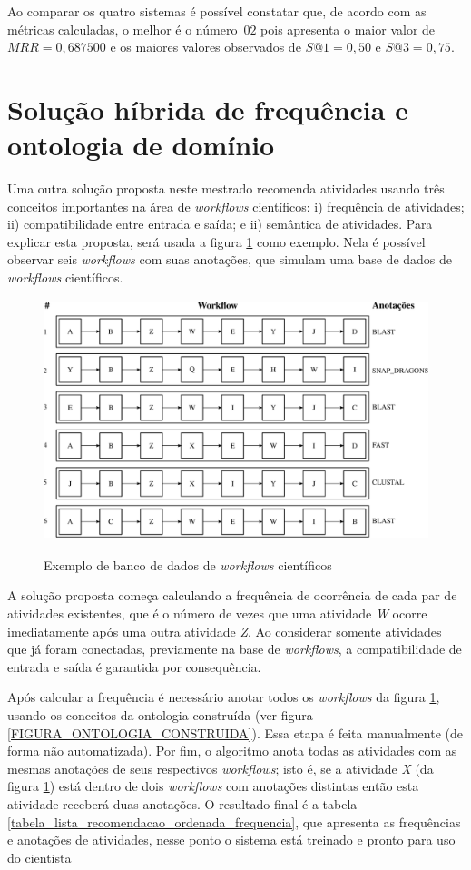Ao comparar os quatro sistemas é possível constatar que, de acordo com as métricas calculadas, o melhor é o número~\(02\) pois apresenta o maior valor de \(MRR = 0,687500\) e os maiores valores observados de \(S@1 = 0,50\) e \(S@3 = 0,75\).


\section{Solução híbrida de frequência e ontologia de domínio}\label{SEC_HIBRIDA_PROPOSTA} 
Uma outra solução proposta neste mestrado recomenda atividades usando três conceitos importantes na área de \emph{workflows} científicos: i) frequência de atividades; ii) compatibilidade entre entrada e saída; e ii) semântica de atividades. Para explicar esta proposta, será usada a figura \ref{FIGURA_ONTOLOGIA_CONSTRUIDA2} como exemplo. Nela é possível observar seis \emph{workflows} com suas anotações, que simulam uma base de dados de \emph{workflows} científicos.
\begin{figure}[!hbt]
	\centering
 	\caption{Exemplo de banco de dados de \emph{workflows} científicos}
		\includegraphics[width=12cm, height=7cm]{./secoes/solucaoProposta/pics/img/recomendacaofreqontologia.eps}
	\label{FIGURA_ONTOLOGIA_CONSTRUIDA2}
	\source{\varAutorData}
\end{figure}

A solução proposta começa calculando a frequência de ocorrência de cada par de atividades existentes, que é o número de vezes que uma atividade \emph{W} ocorre imediatamente após uma outra atividade \emph{Z}. Ao considerar somente atividades que já foram conectadas, previamente na base de \emph{workflows}, a compatibilidade de entrada e saída é garantida por consequência.

Após calcular a frequência é necessário anotar todos os \emph{workflows} da figura \ref{FIGURA_ONTOLOGIA_CONSTRUIDA2}, usando os conceitos da ontologia construída (ver figura \ref{FIGURA_ONTOLOGIA_CONSTRUIDA}). Essa etapa é feita manualmente (de forma não automatizada). Por fim, o algoritmo anota todas as atividades com as mesmas anotações de seus respectivos \emph{workflows}; isto é, se a atividade \emph{X} (da figura \ref{FIGURA_ONTOLOGIA_CONSTRUIDA2}) está dentro de dois \emph{workflows} com anotações distintas então esta atividade receberá duas anotações. O resultado final é a tabela \ref{tabela_lista_recomendacao_ordenada_frequencia}, que apresenta as frequências e anotações de atividades, nesse ponto o sistema está treinado e pronto para uso do cientista

